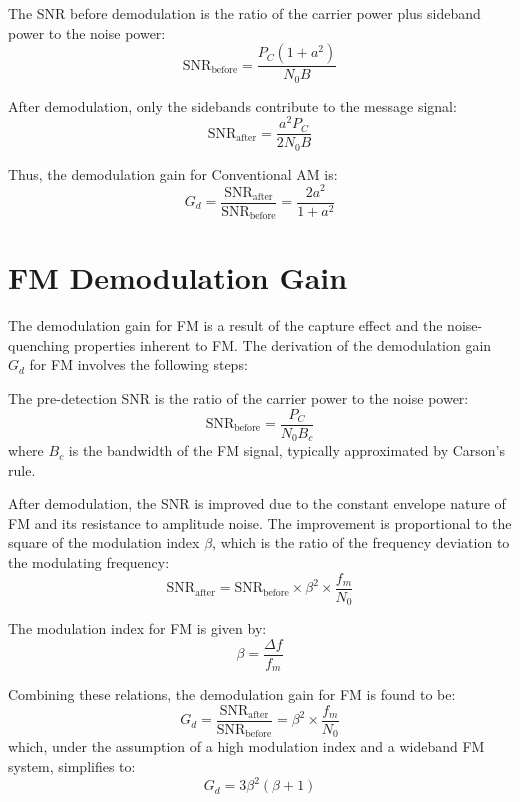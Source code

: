 \documentclass{article}
\begin{document}
The SNR before demodulation is the ratio of the carrier power plus sideband power to the noise power:
\[ \text{SNR}_{\text{before}} = \frac{P_C(1 + a^2)}{N_0 B} \]

After demodulation, only the sidebands contribute to the message signal:
\[ \text{SNR}_{\text{after}} = \frac{a^2 P_C}{2 N_0 B} \]

Thus, the demodulation gain for Conventional AM is:
\[ G_d = \frac{\text{SNR}_{\text{after}}}{\text{SNR}_{\text{before}}} = \frac{2a^2}{1 + a^2} \]

\section*{FM Demodulation Gain}
The demodulation gain for FM is a result of the capture effect and the noise-quenching properties inherent to FM. The derivation of the demodulation gain \( G_d \) for FM involves the following steps:

The pre-detection SNR is the ratio of the carrier power to the noise power:
\[ \text{SNR}_{\text{before}} = \frac{P_C}{N_0 B_c} \]
where \( B_c \) is the bandwidth of the FM signal, typically approximated by Carson's rule.

After demodulation, the SNR is improved due to the constant envelope nature of FM and its resistance to amplitude noise. The improvement is proportional to the square of the modulation index \( \beta \), which is the ratio of the frequency deviation to the modulating frequency:
\[ \text{SNR}_{\text{after}} = \text{SNR}_{\text{before}} \times \beta^2 \times \frac{f_m}{N_0} \]

The modulation index for FM is given by:
\[ \beta = \frac{\Delta f}{f_m} \]

Combining these relations, the demodulation gain for FM is found to be:
\[ G_d = \frac{\text{SNR}_{\text{after}}}{\text{SNR}_{\text{before}}} = \beta^2 \times \frac{f_m}{N_0} \]
which, under the assumption of a high modulation index and a wideband FM system, simplifies to:
\[ G_d = 3\beta^2(\beta + 1) \]
\end{document}
